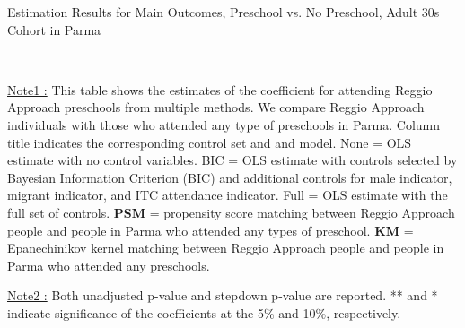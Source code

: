 


\begin{table}[H] \caption{Estimation Results for Main Outcomes, Preschool vs. No Preschool, Adult 30s Cohort in Parma} \label{ols-M-adult30-reg-pres-parma}
\scalebox{0.62}{}
\vspace{1ex} \\
\footnotesize\raggedright{\underline{Note1 :} This table shows the estimates of the coefficient for attending Reggio Approach preschools from multiple methods. We compare Reggio Approach individuals with those who attended any type of preschools in Parma. Column title indicates the corresponding control set and and model. None = OLS estimate with no control variables. BIC = OLS estimate with controls selected by Bayesian Information Criterion (BIC) and additional controls for male indicator, migrant indicator, and ITC attendance indicator. Full = OLS estimate with the full set of controls. \textbf{PSM} =  propensity score matching between Reggio Approach people and people in Parma who attended any types of preschool. \textbf{KM} = Epanechinikov kernel matching between Reggio Approach people and people in Parma who attended any preschools.}

\footnotesize\raggedright{\underline{Note2 :} Both unadjusted p-value and stepdown p-value are reported. ** and * indicate significance of the coefficients at the 5\% and 10\%, respectively.}
\end{table}




